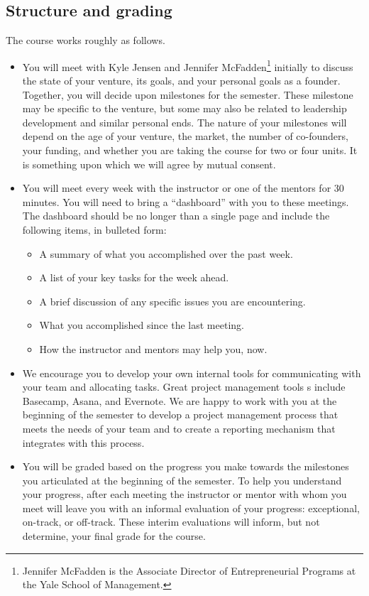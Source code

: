 \subsection*{Structure and grading}

The course works roughly as follows.
\begin{itemize}
	\item You will meet with Kyle Jensen and Jennifer McFadden\footnote{Jennifer McFadden is the Associate Director of Entrepreneurial Programs at the Yale School of Management.}
		initially to discuss
		the state
		of your venture, its goals, and your personal goals as a founder.
		Together, you will decide upon milestones for the semester. These
		milestone may be specific to the venture, but some may also be related
		to leadership development and similar personal ends. The nature of your
		milestones will depend on the age of your venture, the market,
		the number of co-founders, your funding, and whether you are taking
		the course for two or four units. It is something upon
		which we will agree by mutual consent.
	\item You will meet every week with the instructor or one of the
			mentors for 30 minutes. You will need to bring a ``dashboard''
			with you to these meetings. The dashboard should be no longer than a single page and include the following items, in bulleted form:
			\begin{itemize}
				\item A summary of what you accomplished over the past week.
				\item A list of your key tasks for the week ahead.
				\item A brief discussion of any specific issues you are encountering.
				\item What you accomplished since the last meeting.
				\item How the instructor and
					mentors may help you, now.
			\end{itemize}
	\item We encourage you to develop your own internal tools for communicating with your team and allocating tasks. Great project management tools s include Basecamp, Asana, and Evernote. We are happy to work with you at the beginning of the semester to develop a project management process that meets the needs of your team and to create a reporting mechanism that integrates with this process.
	\item You will be graded based on the progress you make towards the
		milestones you articulated at the beginning of the semester.
		To help you understand your progress, after each meeting the
		instructor or mentor with whom you meet will leave you with an
		informal evaluation of your progress: exceptional, on-track, or
		off-track. These interim evaluations will inform, but not
		determine, your final 
		grade for the course.

\end{itemize}

